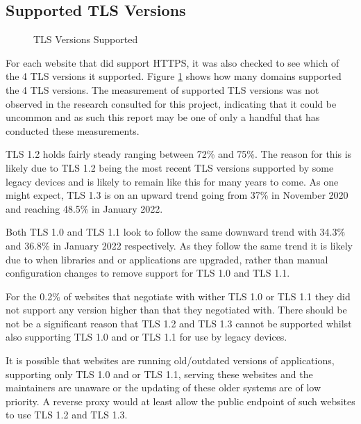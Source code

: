 \documentclass{mscreport}
\begin{document}
\subsection{Supported TLS Versions}

\begin{figure}[H]
	\begin{center}
		\caption{TLS Versions Supported}
		\label{fig:tls_verions_supported}
	\end{center}
\end{figure}

\noindent
For each website that did support HTTPS, it was also checked to see which of the 4 TLS versions it supported. Figure \ref{fig:tls_verions_supported} shows how many domains supported the 4 TLS versions. The measurement of supported TLS versions was not observed in the research consulted for this project, indicating that it could be uncommon and as such this report may be one of only a handful that has conducted these measurements.

\vspace{0.3cm} \noindent
TLS 1.2 holds fairly steady ranging between 72\% and 75\%. The reason for this is likely due to TLS 1.2 being the most recent TLS versions supported by some legacy devices and is likely to remain like this for many years to come. As one might expect, TLS 1.3 is on an upward trend going from 37\% in November 2020 and reaching 48.5\% in January 2022.

\vspace{0.3cm} \noindent
Both TLS 1.0 and TLS 1.1 look to follow the same downward trend with 34.3\% and 36.8\% in January 2022 respectively. As they follow the same trend it is likely due to when libraries and or applications are upgraded, rather than manual configuration changes to remove support for TLS 1.0 and TLS 1.1.

\vspace{0.3cm} \noindent
For the 0.2\% of websites that negotiate with wither TLS 1.0 or TLS 1.1 they did not support any version higher than that they negotiated with. There should be not be a significant reason that TLS 1.2 and TLS 1.3 cannot be supported whilst also supporting TLS 1.0 and or TLS 1.1 for use by legacy devices. 

\vspace{0.3cm} \noindent
It is possible that websites are running old/outdated versions of applications, supporting only TLS 1.0 and or TLS 1.1, serving these websites and the maintainers are unaware or the updating of these older systems are of low priority. A reverse proxy would at least allow the public endpoint of such websites to use TLS 1.2 and TLS 1.3.
\end{document}
